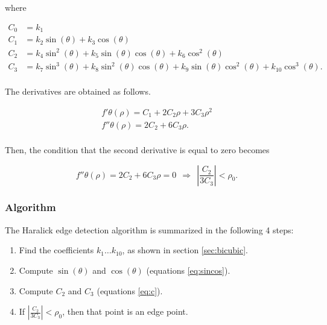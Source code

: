 \documentclass{ipol}
\numberwithin{equation}{section}
\numberwithin{table}{section}
\numberwithin{figure}{section}
\begin{document}
where

\begin{align}
\label{eq:c}
	C_0 & = k_1 \nonumber \nonumber \\
	C_1 & = k_2\sin(\theta) + k_3\cos(\theta) \nonumber \\
	C_2 & = k_4\sin^2(\theta) + k_5\sin(\theta)\cos(\theta) + k_6\cos^2(\theta) \nonumber \\
	C_3 & = k_7\sin^3(\theta) + k_8\sin^2(\theta)\cos(\theta) + k_9\sin(\theta)\cos^2(\theta) + k_{10}\cos^3(\theta). \nonumber \\
\end{align}

The derivatives are obtained as follows.

\begin{align}
	f'{\theta}(\rho) = C_1 + 2C_2\rho + 3C_3\rho^2 \nonumber \\
	f''{\theta}(\rho) = 2C_2 + 6C_3\rho .\nonumber \\
\end{align}

Then, the condition that the second derivative is equal to zero becomes

\begin{equation}
	f''{\theta}(\rho) = 2C_2 + 6C_3\rho = 0 \ \ \Rightarrow \ \ \left| \frac{C_2}{3C_3} \right| < \rho_0 .
\end{equation}


\subsubsection{Algorithm}

The Haralick edge detection algorithm is summarized in the following 4 steps:

\begin{enumerate}
	\item Find the coefficients $k_1 \hdots k_{10}$, as shown in section \ref{sec:bicubic}.
	\item Compute $\sin(\theta)$ and $\cos(\theta)$ (equations \ref{eq:sincos}).
	\item Compute $C_2$ and $C_3$ (equations \ref{eq:c}).
	\item If $\left| \frac{C_2}{3C_3} \right| < \rho_0$, then that point is an edge point.
\end{enumerate}

\end{document}
